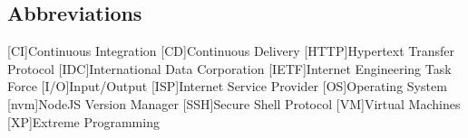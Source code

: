 \newcommand{\abbr}{Abbreviations}
\subsection{Abbreviations}

\begin{acronym}[1234567890]		%
\setlength{\itemsep}{-\parsep}	%

[CI]{Continuous Integration}
[CD]{Continuous Delivery}
[HTTP]{Hypertext Transfer Protocol}
[IDC]{International Data Corporation}
[IETF]{Internet Engineering Task Force}
[I/O]{Input/Output}
[ISP]{Internet Service Provider}
[OS]{Operating System}
[nvm]{NodeJS Version Manager}
[SSH]{Secure Shell Protocol}
[VM]{Virtual Machines}
[XP]{Extreme Programming}
\end{acronym}